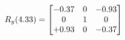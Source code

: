 \documentclass[preview]{standalone}
\begin{document}
\begin{align*}
\special{dvisvgm:raw <g id='unique000'>}R_{y}(4.33) = \begin{bmatrix}-0.37 & 0 & -0.93 \\0 & 1 & 0 \\+0.93 & 0 & -0.37\end{bmatrix}\special{dvisvgm:raw </g>}
\end{align*}
\end{document}
